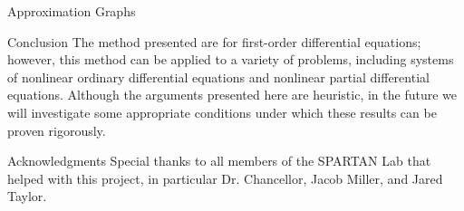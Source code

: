 \documentclass{beamer}
\begin{document}
\begin{frame}
\begin{columns}[t]
\begin{column}{0.24\linewidth}
\begin{block}{Approximation Graphs}
      \end{block}

      \begin{block}{Conclusion}
        The method presented are for first-order differential equations; however, this method can be applied to a variety of problems, including systems of nonlinear ordinary differential equations and nonlinear partial differential equations. Although the arguments presented here are heuristic, in the future we will investigate some appropriate conditions under which these results can be proven rigorously.
      \end{block}

      \begin{block}{Acknowledgments}
        Special thanks to all members of the SPARTAN Lab that helped with this project, in particular Dr. Chancellor, Jacob Miller, and Jared Taylor.
      \end{block}


    \end{column}
  \end{columns}
\end{frame}
\end{document}
